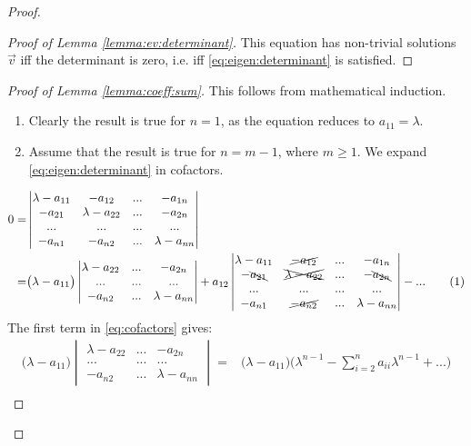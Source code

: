 \documentclass[]{article}
\newcommand\numberthis{\addtocounter{equation}{1}\tag{\theequation}}
\begin{document}
\begin{proof}
\begin{proof}[Proof of Lemma \ref{lemma:ev:determinant}]
		This equation has non-trivial solutions $\vec{v}$ iff the determinant is zero, i.e. iff \eqref{eq:eigen:determinant} is satisfied.
	\end{proof}
	\begin{proof}[Proof of Lemma \ref{lemma:coeff:sum}]
		This follows from mathematical induction.
		\begin{enumerate}
			\item Clearly the result is true for $n=1$, as the equation reduces to $a_{11}=\lambda$.
			\item Assume that the result is true for $n=m-1$, where $m\ge 1$. We expand \eqref{eq:eigen:determinant} in cofactors.
		\end{enumerate}
		\begin{align*}
			0=&\begin{vmatrix}
				\lambda-a_{11}&-a_{12}&...&-a_{1n}\\
				-a_{21}&\lambda-a_{22}&...&-a_{2n}\\
				...&...&...&...\\
				-a_{n1}&-a_{n2}&...&\lambda-a_{nn}
			\end{vmatrix}\\=& \big(\lambda-a_{11}\big)\begin{vmatrix}
														\lambda-a_{22}&...&-a_{2n}\\
														...&...&...\\
														-a_{n2}&...&\lambda-a_{nn}
													\end{vmatrix}+a_{12}\begin{vmatrix}
													\lambda-a_{11}&\cancel{-a_{12}}&...&-a_{1n}\\
													-\bcancel{a_{21}}&\xcancel{\lambda-a_{22}}&...&-\bcancel{a_{2n}}\\
													...&...&...&...\\
													-a_{n1}&\cancel{-a_{n2}}&...&\lambda-a_{nn}
												\end{vmatrix} - ... \numberthis \label{eq:cofactors}
		\end{align*}
		The first term in \eqref{eq:cofactors} gives:
		\begin{align*}
			\big(\lambda-a_{11}\big)\begin{vmatrix}
			\lambda-a_{22}&...&-a_{2n}\\
			...&...&...\\
			-a_{n2}&...&\lambda-a_{nn}
			\end{vmatrix}=&	\big(\lambda-a_{11}\big) \big(\lambda^{n-1} - \sum_{i=2}^{n}a_{ii}\lambda^{n-1}+...\big)	\\

\end{align*}
\end{proof}
\end{proof}
\end{document}
